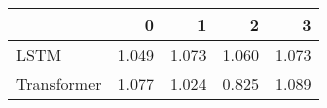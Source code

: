 \begin{tabular}{lrrrr}
\toprule
{} &   0 &   1 &   2 &   3 \\
\midrule
LSTM        & 1.049 & 1.073 & 1.060 & 1.073 \\
Transformer & 1.077 & 1.024 & 0.825 & 1.089 \\
\bottomrule
\end{tabular}
